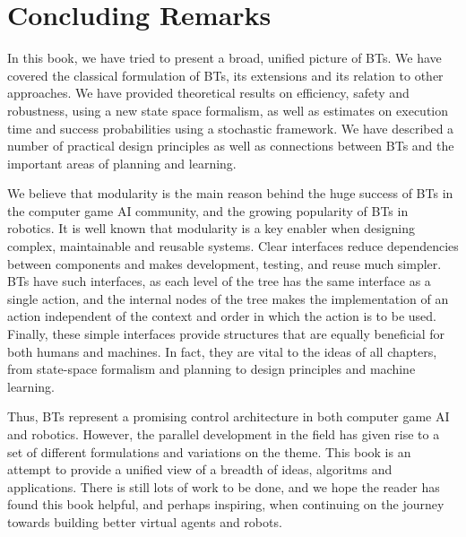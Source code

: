 
\chapter{Concluding Remarks}
\thispagestyle{empty}

In this book, we have tried to present a broad, unified picture of BTs.
We have covered the classical formulation of BTs, its extensions and its relation to other approaches.
We have provided theoretical results on efficiency, safety and robustness, using a new state space formalism,
as well as estimates on execution time and success probabilities using a stochastic framework.
We have described a number of practical design principles as well as connections between BTs and the important areas of planning and learning.

We believe that modularity is the main reason behind the huge success of BTs in the computer game AI community, and the growing popularity of BTs in robotics.
It is well known that modularity is a key enabler when designing
 complex, maintainable and reusable systems. Clear interfaces 
 reduce dependencies between components and makes development, testing, and reuse much simpler.
 BTs have such  interfaces, as each level of the tree has the same interface as a single action,
 and the internal nodes of the tree makes
 the implementation of an action  independent of the context and order in which the action is to be used. 
 Finally, these simple interfaces provide structures that are equally beneficial for both humans and machines. 
 In fact, they are vital to the ideas of all chapters, from state-space formalism and planning to design principles and machine learning.

 
 



Thus, BTs represent a promising control architecture in both computer game AI and robotics. However, the parallel development in the field has given rise to a set of different formulations and variations on the theme.  This book is an attempt to provide a unified view of a breadth of ideas, algoritms and applications.
There is still lots of work to be done, and we hope the reader has found this book helpful,
and perhaps inspiring, when continuing on the journey towards building better virtual agents and robots.

